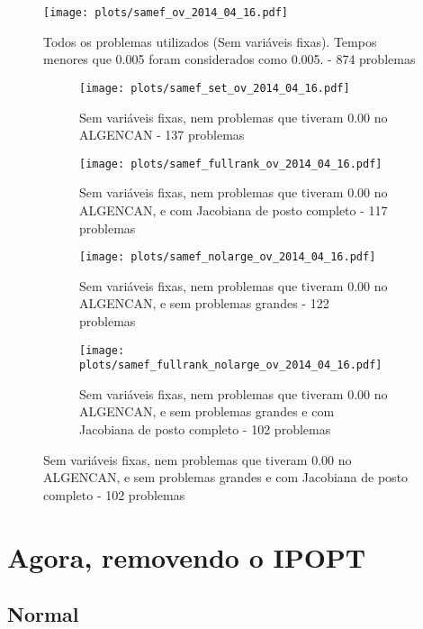 \documentclass{article}
\begin{document}
\begin{figure}[H]
  \centering
  \texttt{[image: plots/samef\_ov\_2014\_04\_16.pdf]}
  \caption{Todos os problemas utilizados (Sem variáveis fixas). Tempos menores
    que 0.005 foram considerados como 0.005. - 874 problemas}
\end{figure}
\begin{figure}[H]
  \centering
  \begin{subfigure}{0.48\textwidth}
    \texttt{[image: plots/samef\_set\_ov\_2014\_04\_16.pdf]}
    \caption{Sem variáveis fixas, nem problemas
      que tiveram 0.00 no ALGENCAN - 137 problemas}
  \end{subfigure}
  \begin{subfigure}{0.48\textwidth}
    \texttt{[image: plots/samef\_fullrank\_ov\_2014\_04\_16.pdf]}
    \caption{Sem variáveis fixas, nem problemas
      que tiveram 0.00 no ALGENCAN, e com Jacobiana de posto completo - 117
      problemas}
  \end{subfigure}
  \begin{subfigure}{0.48\textwidth}
    \texttt{[image: plots/samef\_nolarge\_ov\_2014\_04\_16.pdf]}
    \caption{Sem variáveis fixas, nem problemas
      que tiveram 0.00 no ALGENCAN, e sem problemas grandes - 122 problemas}
  \end{subfigure}
  \begin{subfigure}{0.48\textwidth}
    \texttt{[image: plots/samef\_fullrank\_nolarge\_ov\_2014\_04\_16.pdf]}
    \caption{Sem variáveis fixas, nem problemas
      que tiveram 0.00 no ALGENCAN, e sem problemas grandes e com Jacobiana de
      posto completo - 102 problemas}
  \end{subfigure}
\end{figure}

\section{Agora, removendo o IPOPT}

\subsection{Normal}
\end{document}
